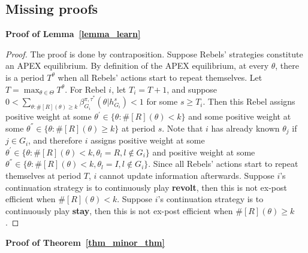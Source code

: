 \documentclass[12pt,letter]{article}
\newtheorem*{theorem*}{Theorem}
\newtheorem*{lemma*}{Lemma}
\theoremstyle{definition}
\theoremstyle{definition}
\theoremstyle{remark}
\theoremstyle{claim}
\begin{document}
\clearpage
\subsection{Missing proofs}
\noindent\textbf{Proof of Lemma~\ref{lemma_learn}}
\begin{proof}
The proof is done by contraposition. Suppose Rebels' strategies constitute an APEX equilibrium. By definition of the APEX equilibrium, at every $\theta$, there is a period $T^{\theta}$ when all Rebels' actions start to repeat themselves. Let $T=\max_{\theta\in \Theta}{T^{\theta}}$. For Rebel $i$, let $T_i=T+1$, and suppose $0<\sum_{\theta:\#[R](\theta)\geq k}\beta^{\pi,\tau^*}_{G_i}(\theta|h^{s}_{G_i})<1$ for some $s\geq T_i$. Then this Rebel assigns positive weight at some ${\theta^{'}}\in \{\theta:\#[R](\theta)< k\}$ and some positive weight at some ${\theta^{''}}\in \{\theta:\#[R](\theta)\geq k\}$ at period $s$. Note that $i$ has already known $\theta_j$ if $j\in G_i$, and therefore $i$ assigns positive weight at some $\theta^{'}\in \{\theta:\#[R](\theta)< k, \theta_l=R, l\notin G_i\}$ and positive weight at some $\theta^{''}\in \{\theta:\#[R](\theta)< k, \theta_l=I, l\notin G_i\}$. Since all Rebels' actions start to repeat themselves at period $T$, $i$ cannot update information afterwards. Suppose $i$'s continuation strategy is to continuously play \textbf{revolt}, then this is not ex-post efficient when $\#[R](\theta)< k$. Suppose $i$'s continuation strategy is to continuously play \textbf{stay}, then this is not ex-post efficient when $\#[R](\theta)\geq k$.
\end{proof}
%
%
\bigskip
\noindent\textbf{Proof of Theorem~\ref{thm_minor_thm}}
\end{document}
